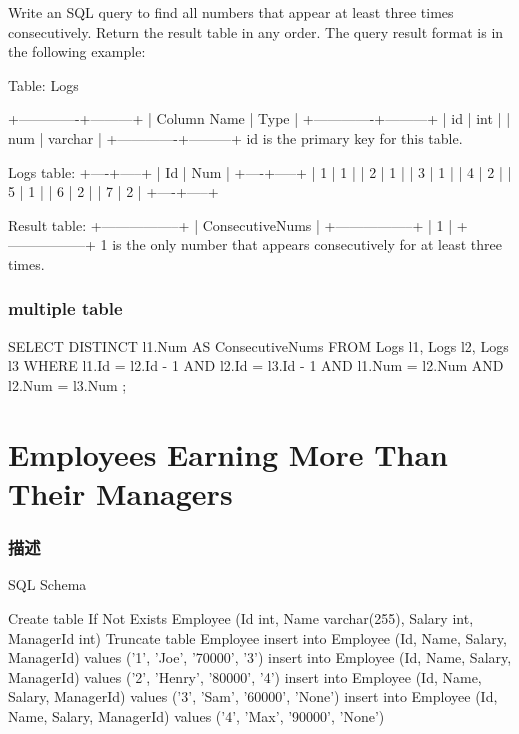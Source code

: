 Write an SQL query to find all numbers that appear at least three times consecutively.
Return the result table in any order.
The query result format is in the following example:

Table: Logs
\begin{Code}
+-------------+---------+
| Column Name | Type    |
+-------------+---------+
| id          | int     |
| num         | varchar |
+-------------+---------+
id is the primary key for this table.
\end{Code}


\begin{Code}
Logs table:
+----+-----+
| Id | Num |
+----+-----+
| 1  | 1   |
| 2  | 1   |
| 3  | 1   |
| 4  | 2   |
| 5  | 1   |
| 6  | 2   |
| 7  | 2   |
+----+-----+

Result table:
+-----------------+
| ConsecutiveNums |
+-----------------+
| 1               |
+-----------------+
1 is the only number that appears consecutively for at least three times.
\end{Code}


\subsubsection{multiple table}
\begin{Code}
SELECT DISTINCT
    l1.Num AS ConsecutiveNums
FROM
    Logs l1,
    Logs l2,
    Logs l3
WHERE
    l1.Id = l2.Id - 1
    AND l2.Id = l3.Id - 1
    AND l1.Num = l2.Num
    AND l2.Num = l3.Num
;
\end{Code}

\section{Employees Earning More Than Their Managers} %
\label{sec:employees-earning-more-than-their-managers}


\subsubsection{描述}
SQL Schema

\begin{Code}
Create table If Not Exists Employee (Id int, Name varchar(255), Salary int, ManagerId int)
Truncate table Employee
insert into Employee (Id, Name, Salary, ManagerId) values ('1', 'Joe', '70000', '3')
insert into Employee (Id, Name, Salary, ManagerId) values ('2', 'Henry', '80000', '4')
insert into Employee (Id, Name, Salary, ManagerId) values ('3', 'Sam', '60000', 'None')
insert into Employee (Id, Name, Salary, ManagerId) values ('4', 'Max', '90000', 'None')
\end{Code}

